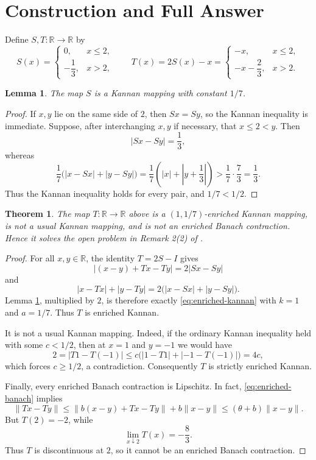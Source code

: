 \documentclass[11pt]{amsart}
\newtheorem{theorem}{Theorem}
\newtheorem{lemma}{Lemma}
\newcommand{\R}{\mathbb R}
\begin{document}
\section*{Construction and Full Answer}

Define $S,T:\R\to\R$ by
\[
 S(x)=
 \begin{cases}
  0,&x\leq2,\\
  -\dfrac13,&x>2,
 \end{cases}
 \qquad
 T(x)=2S(x)-x=
 \begin{cases}
  -x,&x\leq2,\\
  -x-\dfrac23,&x>2.
 \end{cases}
\]

\begin{lemma}\label{lem:S}
The map $S$ is a Kannan mapping with constant $1/7$.
\end{lemma}

\begin{proof}
If $x,y$ lie on the same side of $2$, then $Sx=Sy$, so the Kannan
inequality is immediate. Suppose, after interchanging $x,y$ if necessary,
that $x\leq2<y$. Then
\[
 |Sx-Sy|=\frac13,
 \]
whereas
\[
 \frac17\bigl(|x-Sx|+|y-Sy|\bigr)
 =\frac17\left(|x|+\left|y+\frac13\right|\right)
 >\frac17\cdot\frac73=\frac13.
\]
Thus the Kannan inequality holds for every pair, and $1/7<1/2$.
\end{proof}

\begin{theorem}\label{thm:answer}
The map $T:\R\to\R$ above is a $(1,1/7)$-enriched Kannan mapping, is not
a usual Kannan mapping, and is not an enriched Banach contraction. Hence it
solves the open problem in Remark 2(2) of \cite{BP-contraction}.
\end{theorem}

\begin{proof}
For all $x,y\in\R$, the identity $T=2S-I$ gives
\[
 \bigl|(x-y)+Tx-Ty\bigr|=2|Sx-Sy|
\]
and
\[
 |x-Tx|+|y-Ty|
 =2\bigl(|x-Sx|+|y-Sy|\bigr).
\]
Lemma \ref{lem:S}, multiplied by $2$, is therefore exactly
\eqref{eq:enriched-kannan} with $k=1$ and $a=1/7$. Thus $T$ is enriched
Kannan.

It is not a usual Kannan mapping. Indeed, if the ordinary Kannan inequality
held with some $c<1/2$, then at $x=1$ and $y=-1$ we would have
\[
 2=|T1-T(-1)|
 \leq c\bigl(|1-T1|+|-1-T(-1)|\bigr)=4c,
\]
which forces $c\geq1/2$, a contradiction. Consequently $T$ is strictly
enriched Kannan.

Finally, every enriched Banach contraction is Lipschitz. In fact,
\eqref{eq:enriched-banach} implies
\[
 \|Tx-Ty\|
 \leq \|b(x-y)+Tx-Ty\|+b\|x-y\|
 \leq (\theta+b)\|x-y\|.
\]
But $T(2)=-2$, while
\[
 \lim_{x\downarrow2}T(x)=-\frac83.
\]
Thus $T$ is discontinuous at $2$, so it cannot be an enriched Banach
contraction.
\end{proof}
\end{document}
